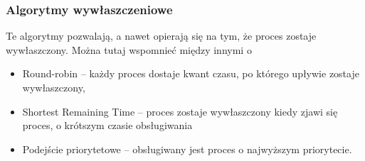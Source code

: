 \subsubsection{Algorytmy wywłaszczeniowe}
Te algorytmy pozwalają, a nawet opierają się na tym, że proces zostaje wywłaszczony.
Można tutaj wspomnieć między innymi o
\begin{itemize}
	\item{Round-robin -- każdy proces dostaje kwant czasu, po którego upływie zostaje wywłaszczony,}
	\item{Shortest Remaining Time -- proces zostaje wywłaszczony kiedy zjawi się proces, o krótszym czasie obsługiwania}
	\item{Podejście priorytetowe -- obsługiwany jest proces o najwyższym priorytecie.}
\end{itemize}

